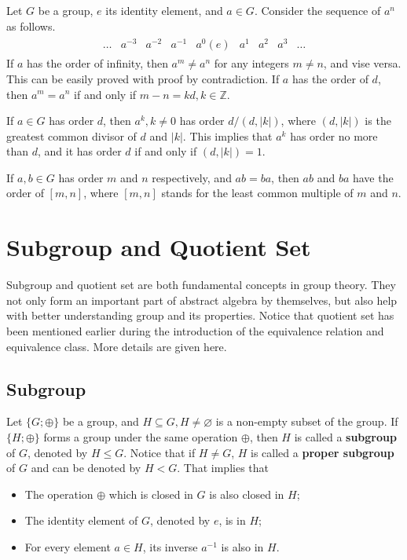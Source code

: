 Let $G$ be a group, $e$ its identity element, and $a\in G$. Consider the sequence of $a^n$ as follows.
\begin{eqnarray}
\begin{array}{ccccccccc}
  \ldots & a^{-3} & a^{-2} & a^{-1} & a^0 (e) & a^1 & a^2 & a^3 & \ldots \nonumber 
\end{array}
\end{eqnarray}
If $a$ has the order of infinity, then $a^m \neq a^n$ for any integers $m\neq n$, and vise versa. This can be easily proved with proof by contradiction. If $a$ has the order of $d$, then $a^m = a^n$ if and only if $m-n = kd, k\in \mathbb{Z}$.

If $a \in G$ has order $d$, then $a^{k}, k\neq0$ has order $d/(d,|k|)$, where $(d,|k|)$ is the greatest common divisor of $d$ and $|k|$. This implies that $a^{k}$ has order no more than $d$, and it has order $d$ if and only if $(d,|k|)=1$.

If $a,b \in G$ has order $m$ and $n$ respectively, and $ab=ba$, then $ab$ and $ba$ have the order of $[m,n]$, where $[m,n]$ stands for the least common multiple of $m$ and $n$.

\section{Subgroup and Quotient Set}

Subgroup and quotient set are both fundamental concepts in group theory. They not only form an important part of abstract algebra by themselves, but also help with better understanding group and its properties. Notice that quotient set has been mentioned earlier during the introduction of the equivalence relation and equivalence class. More details are given here.

\subsection{Subgroup}

Let $\{G;\oplus\}$ be a group, and $H\subseteq G, H\neq\varnothing$ is a non-empty subset of the group. If $\{H;\oplus\}$ forms a group under the same operation $\oplus$, then $H$ is called a \textbf{subgroup} of $G$, denoted by $H\leq G$. Notice that if $H \neq G$, $H$ is called a \textbf{proper subgroup} of $G$ and can be denoted by $H<G$. That implies that
\begin{itemize}
  \item The operation $\oplus$ which is closed in $G$ is also closed in $H$;
  \item The identity element of $G$, denoted by $e$, is in $H$;
  \item For every element $a\in H$, its inverse $a^{-1}$ is also in $H$.
\end{itemize}

